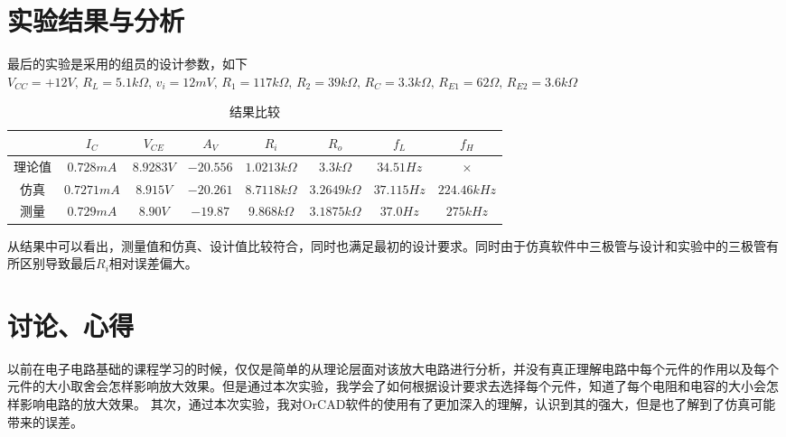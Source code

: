 \documentclass{../source/Experiment}
\begin{document}
    \section{实验结果与分析}
    最后的实验是采用的组员的设计参数，如下\\
    $V_{CC} = +12V,\, R_L = 5.1k\Omega,\, v_i = 12mV,\, R_1 = 117k\Omega,\, R_2 = 39k\Omega,\, R_C = 3.3k\Omega,\, R_{E1} = 62\Omega,\, R_{E2} = 3.6k\Omega$
    \begin{table}[h]
        \centering
        \begin{tabular}{|c|c|c|c|c|c|c|c|}
        \hline
            & $I_C$     & $V_{CE}$  & $A_V$     & $R_i$           & $R_o$           & $f_L$      & $f_H$       \\ \hline
        理论值 & $0.728mA$ & $8.9283V$ & $-20.556$ & $1.0213k\Omega$ & $3.3k\Omega$    & $34.51Hz$  & $\times$    \\ \hline
        仿真  & $0.7271mA$ & $8.915V$  & $-20.261$ & $8.7118k\Omega$ & $3.2649k\Omega$ & $37.115Hz$ & $224.46kHz$ \\ \hline
        测量  & $0.729mA$   & $8.90V$    & $-19.87$  & $9.868k\Omega$  & $3.1875k\Omega$ & $37.0Hz$   & $275kHz$    \\ \hline
        \end{tabular}
        \caption{结果比较}
        \end{table}
        从结果中可以看出，测量值和仿真、设计值比较符合，同时也满足最初的设计要求。同时由于仿真软件中三极管与设计和实验中的三极管有所区别导致最后$R_i$相对误差偏大。
    \section{讨论、心得}
    以前在电子电路基础的课程学习的时候，仅仅是简单的从理论层面对该放大电路进行分析，并没有真正理解电路中每个元件的作用以及每个元件的大小取舍会怎样影响放大效果。但是通过本次实验，我学会了如何根据设计要求去选择每个元件，知道了每个电阻和电容的大小会怎样影响电路的放大效果。
    其次，通过本次实验，我对OrCAD软件的使用有了更加深入的理解，认识到其的强大，但是也了解到了仿真可能带来的误差。
\end{document}
